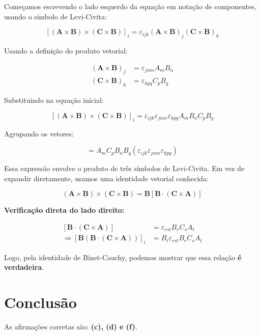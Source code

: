 \documentclass[a4paper,12pt]{article}
\begin{document}
\begin{flushleft}
Começamos escrevendo o lado esquerdo da equação em notação de componentes, usando o símbolo de Levi-Civita:

\begin{equation}
\left[(\mathbf{A} \times \mathbf{B}) \times (\mathbf{C} \times \mathbf{B})\right]_i
= \varepsilon_{ijk} (\mathbf{A} \times \mathbf{B})_j (\mathbf{C} \times \mathbf{B})_k
\end{equation}

Usando a definição do produto vetorial:

\begin{align}
(\mathbf{A} \times \mathbf{B})_j &= \varepsilon_{jmn} A_m B_n \\
(\mathbf{C} \times \mathbf{B})_k &= \varepsilon_{kpq} C_p B_q
\end{align}

Substituindo na equação inicial:

\begin{equation}
\left[(\mathbf{A} \times \mathbf{B}) \times (\mathbf{C} \times \mathbf{B})\right]_i
= \varepsilon_{ijk} \varepsilon_{jmn} \varepsilon_{kpq} A_m B_n C_p B_q
\end{equation}

Agrupando os vetores:

\begin{equation}
= A_m C_p B_n B_q \left( \varepsilon_{ijk} \varepsilon_{jmn} \varepsilon_{kpq} \right)
\end{equation}

Essa expressão envolve o produto de três símbolos de Levi-Civita. Em vez de expandir diretamente, usamos uma identidade vetorial conhecida:

\begin{equation}
(\mathbf{A} \times \mathbf{B}) \times (\mathbf{C} \times \mathbf{B}) = \mathbf{B} \left[ \mathbf{B} \cdot (\mathbf{C} \times \mathbf{A}) \right]
\end{equation}

\textbf{Verificação direta do lado direito:}

\begin{align}
\left[ \mathbf{B} \cdot (\mathbf{C} \times \mathbf{A}) \right] &= \varepsilon_{rst} B_r C_s A_t \\
\Rightarrow \left[ \mathbf{B} \left( \mathbf{B} \cdot (\mathbf{C} \times \mathbf{A}) \right) \right]_i &= B_i \varepsilon_{rst} B_r C_s A_t
\end{align}

Logo, pela identidade de Binet-Cauchy, podemos mostrar que essa relação \textbf{é \colorbox{green!30}{verdadeira}}.

\section*{Conclusão}
As afirmações corretas são: \textbf{(c), (d) e (f)}.

\end{flushleft}
\end{document}
